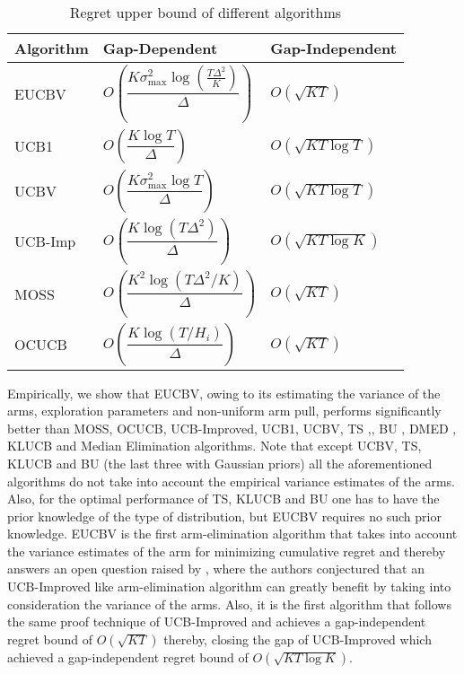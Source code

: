 \documentclass[MS,synopsis]{iitmdiss}
\begin{document}
\begin{table}[t]
\caption{Regret upper bound of different algorithms}
\label{tab:comp-bds}
\begin{center}
\begin{tabular}{|p{5em}|p{12em}|p{7em}|}
\hline
Algorithm  &   \hspace*{1mm}Gap-Dependent & Gap-Independent \\
\hline
\hline
EUCBV		& $O\left( \dfrac{K\sigma_{\max}^{2}\log (\frac{T\Delta^2}{K})}{\Delta}\right)$ & $O\left(\sqrt{KT}\right)$\\
\hline
\hline
UCB1        & $O\left( \dfrac{K\log T}{\Delta} \right)$ & $O\left(\sqrt{KT\log T}\right)$ \\%
\hline
\hline
UCBV        & $O\left( \dfrac{K\sigma_{\max}^{2}\log T}{\Delta} \right)$ & $O\left(\sqrt{KT\log T}\right)$ \\
\hline
\hline
UCB-Imp 		& $O\left( \dfrac{K\log (T\Delta^2)}{\Delta} \right)$ & $O\left(\sqrt{KT\log K}\right)$ \\%
\hline
\hline
MOSS	     	& $O\left( \dfrac{K^2\log (T\Delta^2 /K)}{\Delta}\right)$ & $O\left(\sqrt{KT}\right)$\\%
\hline
\hline
OCUCB     	& $O\left( \dfrac{K\log (T/ H_{i})}{\Delta}\right)$ & $O\left(\sqrt{KT}\right)$\\\midrule
\end{tabular}
\end{center}
\end{table}


Empirically, we show that EUCBV, owing to its estimating the variance of the arms, exploration parameters and non-uniform arm pull, performs significantly better than MOSS, OCUCB, UCB-Improved, UCB1, UCBV, TS \citep{thompson1933likelihood},\citep{agrawal2012analysis}, BU \citep{kaufmann2012bayesian}, DMED \citep{honda2010asymptotically}, KLUCB \citep{garivier2011kl} and Median Elimination \citep{even2006action} algorithms. Note that except UCBV, TS, KLUCB and BU (the last three with Gaussian priors) all the aforementioned algorithms do not take into account the empirical variance estimates of the arms. Also, for the optimal performance of TS, KLUCB and BU one has to have the prior knowledge of the type of distribution, but EUCBV requires no such prior knowledge. EUCBV is the first arm-elimination algorithm that takes into account the variance estimates of the arm for minimizing cumulative regret and thereby answers an open question raised by \citet{auer2010ucb}, where the authors conjectured that an UCB-Improved like arm-elimination algorithm can greatly benefit by taking into consideration the variance of the arms. Also, it is the first algorithm that follows the same proof technique of UCB-Improved and achieves a gap-independent regret bound of $O\left( \sqrt{KT} \right)$ thereby, closing the gap of UCB-Improved which achieved a gap-independent regret bound of $O\left( \sqrt{KT\log K} \right)$. 
\end{document}

